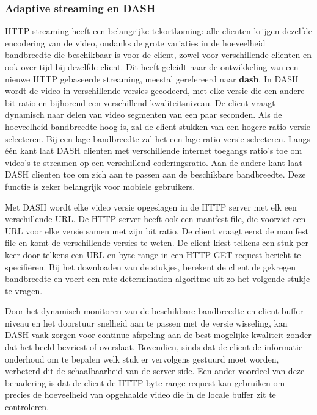 \subsubsection{Adaptive streaming en DASH}

\noindent HTTP streaming heeft een belangrijke tekortkoming: alle clienten krijgen dezelfde encodering van de video, ondanks de grote variaties in de hoeveelheid bandbreedte die beschikbaar is voor de client, zowel voor verschillende clienten en ook over tijd bij dezelfde client. Dit heeft geleidt naar de ontwikkeling van een nieuwe HTTP gebaseerde streaming, meestal gerefereerd naar \textbf{\acrfull{dash}}. In DASH wordt de video in verschillende  versies gecodeerd, met elke versie die een andere bit ratio en bijhorend een verschillend kwaliteitsniveau. De client vraagt dynamisch naar delen van video segmenten van een paar seconden. Als de hoeveelheid bandbreedte hoog is, zal de client stukken van een hogere ratio versie selecteren. Bij een lage bandbreedte zal het een lage ratio versie selecteren.
Langs één kant laat DASH clienten met verschillende internet toegangs ratio’s toe om video’s te streamen op een verschillend coderingsratio. Aan de andere kant laat DASH clienten toe om zich aan te passen aan de beschikbare bandbreedte. Deze functie is zeker belangrijk voor mobiele gebruikers.

\noindent Met DASH wordt elke video versie opgeslagen in de HTTP server met elk een verschillende URL. De HTTP server heeft ook een manifest file, die voorziet een URL voor elke versie samen met zijn bit ratio. De client vraagt eerst de manifest file en komt de verschillende versies te weten. De client kiest telkens een stuk per keer door telkens een URL en byte range in een HTTP GET request bericht te specifiëren. Bij het downloaden van de stukjes, berekent de client de gekregen bandbreedte en voert een rate determination algoritme uit zo het volgende stukje te vragen.

\noindent Door het dynamisch monitoren van de beschikbare bandbreedte en client buffer niveau en het doorstuur snelheid aan te passen met de versie wisseling, kan DASH vaak zorgen voor continue afspeling aan de best mogelijke kwaliteit zonder dat het beeld bevriest of overslaat. Bovendien, sinds dat de client de informatie onderhoud om te bepalen welk stuk er vervolgens gestuurd moet worden, verbeterd dit de schaalbaarheid van de server-side. Een ander voordeel van deze benadering is dat de client de HTTP byte-range request kan gebruiken om precies de hoeveelheid van opgehaalde video die in de locale buffer zit te controleren.

